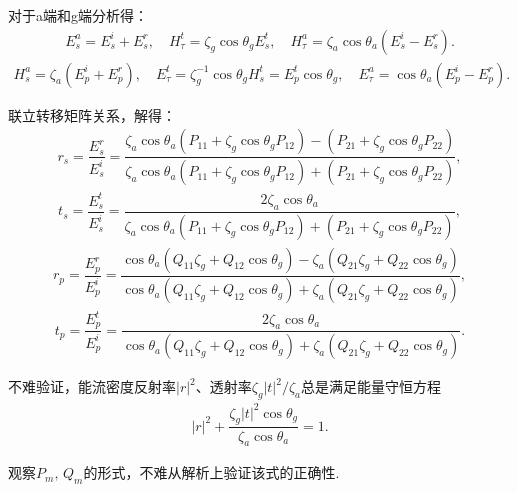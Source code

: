 对于a端和g端分析得：
\begin{align*}
	E_s^a = E_s^i + E_s^r,\quad H_\tau^t = \zeta_g \cos\theta_g E_s^t,\quad H_\tau^a = \zeta_a \cos\theta_a (E_s^i - E_s^r).
\end{align*}
\begin{align*}
	H_s^a = \zeta_a (E_p^i + E_p^r),\quad E_\tau^t = \zeta_g^{-1} \cos\theta_g H_s^t = E_p^t \cos\theta_g,\quad E_\tau^a = \cos\theta_a (E_p^i - E_p^r).
\end{align*}

联立转移矩阵关系，解得：
\begin{align*}
	r_s = \dfrac{E_s^r}{E_s^i} = \dfrac{\zeta_a \cos\theta_a (P_{11} + \zeta_g \cos\theta_g P_{12}) - (P_{21} + \zeta_g \cos\theta_g P_{22})}{\zeta_a \cos\theta_a (P_{11} + \zeta_g \cos\theta_g P_{12}) + (P_{21} + \zeta_g \cos\theta_g P_{22})},
\end{align*}
\begin{align*}
	t_s = \dfrac{E_s^t}{E_s^i} = \dfrac{2\zeta_a \cos\theta_a}{\zeta_a \cos\theta_a (P_{11} + \zeta_g \cos\theta_g P_{12}) + (P_{21} + \zeta_g \cos\theta_g P_{22})},
\end{align*}
\begin{align*}
	r_p = \dfrac{E_p^r}{E_p^i} = \dfrac{\cos\theta_a (Q_{11}\zeta_g + Q_{12}\cos\theta_g) - \zeta_a (Q_{21}\zeta_g + Q_{22}\cos\theta_g)}{\cos\theta_a (Q_{11}\zeta_g + Q_{12}\cos\theta_g) + \zeta_a (Q_{21}\zeta_g + Q_{22}\cos\theta_g)},
\end{align*}
\begin{align*}
	t_p = \dfrac{E_p^t}{E_p^i} = \dfrac{2\zeta_a \cos\theta_a}{\cos\theta_a (Q_{11}\zeta_g + Q_{12}\cos\theta_g) + \zeta_a (Q_{21}\zeta_g + Q_{22}\cos\theta_g)}.
\end{align*}

不难验证，能流密度反射率\(|r|^2\)、透射率\(\zeta_g |t|^2/\zeta_a\)总是满足能量守恒方程
\begin{align*}
	|r|^2+\dfrac{\zeta_g|t|^2\cos\theta_g}{\zeta_a \cos\theta_a}=1.
\end{align*}

观察\(P_m,\,Q_m\)的形式，不难从解析上验证该式的正确性.

